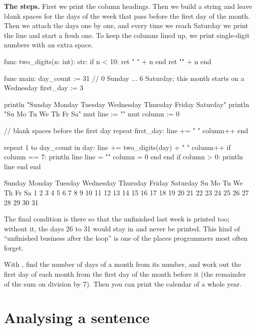 \textbf{The steps.} First we print the column headings. Then we build a
string and leave blank spaces for the days of the week that pass before the
first day of the month. Then we attach the days one by one, and every time we
reach Saturday we print the line and start a fresh one. To keep the columns
lined up, we print single-digit numbers with an extra space.

\begin{salamcode}
func two_digits(n: int): str:
    if n < 10: ret " " + n end
    ret "" + n
end

func main:
    day_count := 31
    // 0 Sunday ... 6 Saturday; this month starts on a Wednesday
    first_day := 3

    println "Sunday Monday Tuesday Wednesday Thursday Friday Saturday"
    println "Su  Mo  Tu  We  Th  Fr  Sa"
    mut line := ""
    mut column := 0

    // blank spaces before the first day
    repeat first_day:
        line += "    "
        column++
    end

    repeat 1 to day_count in day:
        line += two_digits(day) + "  "
        column++
        if column == 7:
            println line
            line = ""
            column = 0
        end
    end
    if column > 0: println line end
end
\end{salamcode}

\begin{salamout}
Sunday Monday Tuesday Wednesday Thursday Friday Saturday
Su  Mo  Tu  We  Th  Fr  Sa
             1   2   3   4
 5   6   7   8   9  10  11
12  13  14  15  16  17  18
19  20  21  22  23  24  25
26  27  28  29  30  31
\end{salamout}

The final condition  is there so that the unfinished
last week is printed too; without it, the days 26 to 31 would stay in
 and never be printed. This kind of ``unfinished business after
the loop'' is one of the places programmers most often forget.

\begin{tip}
With , find the number of days of a month from its number, and
work out the first day of each month from the first day of the month before
it (the remainder of the sum on division by 7). Then you can print the
calendar of a whole year.
\end{tip}

\section{Analysing a sentence}

